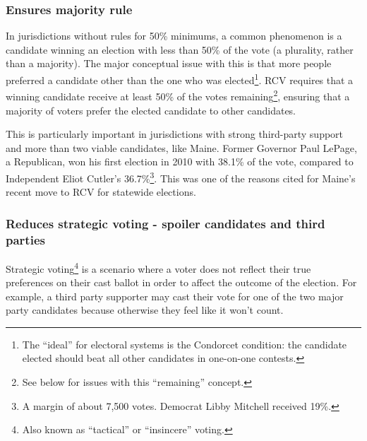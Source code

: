 \documentclass[12pt,twoside]{reedthesis}
\begin{document}
\hypertarget{ensures-majority-rule}{%
\subsubsection{Ensures majority rule}\label{ensures-majority-rule}}

In jurisdictions without rules for 50\% minimums, a common phenomenon is a candidate winning an election with less than 50\% of the vote (a plurality, rather than a majority). The major conceptual issue with this is that more people preferred a candidate other than the one who was elected\footnote{The ``ideal'' for electoral systems is the Condorcet condition: the candidate elected should beat all other candidates in one-on-one contests.}. RCV requires that a winning candidate receive at least 50\% of the votes remaining\footnote{See below for issues with this ``remaining'' concept.}, ensuring that a majority of voters prefer the elected candidate to other candidates.

This is particularly important in jurisdictions with strong third-party support and more than two viable candidates, like Maine. Former Governor Paul LePage, a Republican, won his first election in 2010 with 38.1\% of the vote, compared to Independent Eliot Cutler's 36.7\%\footnote{A margin of about 7,500 votes. Democrat Libby Mitchell received 19\%.}. This was one of the reasons cited for Maine's recent move to RCV for statewide elections.

\hypertarget{reduces-strategic-voting---spoiler-candidates-and-third-parties}{%
\subsubsection{Reduces strategic voting - spoiler candidates and third parties}\label{reduces-strategic-voting---spoiler-candidates-and-third-parties}}

Strategic voting\footnote{Also known as ``tactical'' or ``insincere'' voting.} is a scenario where a voter does not reflect their true preferences on their cast ballot in order to affect the outcome of the election. For example, a third party supporter may cast their vote for one of the two major party candidates because otherwise they feel like it won't count.
\end{document}
